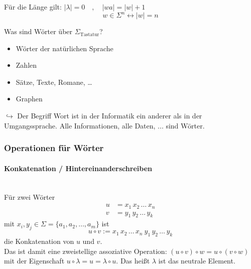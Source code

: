 \documentclass[runningheads]{llncs}
\begin{document}
Für die Länge gilt: $|\lambda| = 0 \quad , \quad |wa| = |w| + 1$
\[ w \in \Sigma^n \leftrightarrow |w| = n \]

\begin{remark}
    Was sind Wörter über $\Sigma_{\text{Tastatur}}$?
    \begin{itemize}
        \renewcommand{\labelitemi}{$\rightarrow$}
        \item Wörter der natürlichen Sprache
        \item Zahlen
        \item Sätze, Texte, Romane, \dots 
        \item Graphen
    \end{itemize}
    $\hookrightarrow$ Der Begriff Wort ist in der Informatik ein anderer als in der Umgangssprache. Alle Informationen, alle Daten, ... sind Wörter.
\end{remark}

\pagebreak

\subsubsection{Operationen für Wörter}
\paragraph{Konkatenation / Hintereinanderschreiben}\phantom{ }\\
Für zwei Wörter
    \begin{align*}
        u &= x_1\, x_2\, \dots\, x_n \\
        v &= y_1\, y_2\, \dots\, y_k
    \end{align*}
    mit $x_i, y_j \in \Sigma = \{ a_1, a_2, \dots, a_m \}$ ist
    \[ u \circ v := x_1\, x_2\, \dots\, x_n\  y_1\, y_2\, \dots\, y_k \]
    die Konkatenation von $u$ und $v$.\\
    Das ist damit eine zweistellige assoziative Operation: $(u\circ v)\circ w = u \circ (v\circ w)$ mit der Eigenschaft $u\circ \lambda = u = \lambda \circ u$. Das heißt $\lambda$ ist das neutrale Element.
\end{document}
